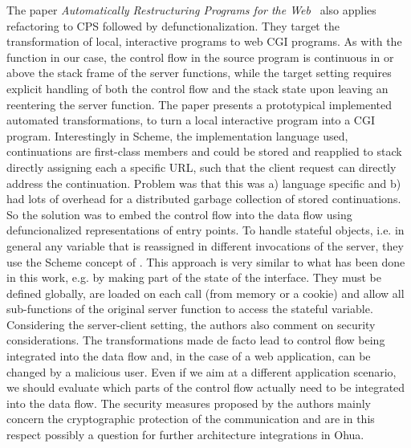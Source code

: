 The paper \emph{Automatically Restructuring Programs for the Web}~\cite{graunke2001automatically} also applies refactoring to CPS followed by defunctionalization. They target the transformation of local, interactive programs to web CGI programs. As with the  function in our case, the control flow in the source program is continuous in or above the stack frame of the server functions, while the target setting requires explicit handling of both the control flow and the stack state upon leaving an reentering the server function. The paper presents a 
 prototypical implemented automated transformations, to turn a local interactive program into a CGI program. Interestingly in Scheme, the implementation language used, continuations are first-class members and could be stored and reapplied to stack directly assigning each a specific URL, such that the client request can directly address the continuation. Problem was that this was a) language specific and b) had lots of overhead for a distributed garbage collection of stored continuations. So the solution was to embed the control flow into the data flow using defuncionalized representations of entry points. To handle stateful objects, i.e. in general any variable that is reassigned in different invocations of the server, they use the Scheme concept of . This approach is very similar to what has been done in this work, e.g. by making part of the state of the interface. They must be defined globally, are loaded on each call (from memory or a cookie) and allow all sub-functions of the original server function to access the stateful variable. Considering the server-client setting, the authors also comment on security considerations. The transformations made de facto lead to control flow being integrated into the data flow and, in the case of a web application, can be changed by a malicious user. Even if we aim at a different application scenario, we should evaluate which parts of the control flow actually need to be integrated into the data flow. The security measures proposed by the authors mainly concern the cryptographic protection of the communication and are in this respect possibly a question for further architecture integrations in Ohua. \\

